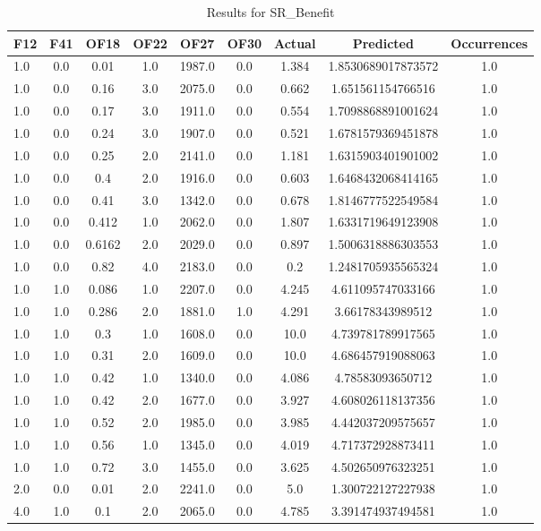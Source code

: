 \clearpage
\begin{table}[htbp]
\centering
\begin{tabular}{|l|c|c|c|c|c|c|c|c|}
\hline
F12 & F41 & OF18 & OF22 & OF27 & OF30 & Actual & Predicted & Occurrences \\
\hline
1.0 & 0.0 & 0.01 & 1.0 & 1987.0 & 0.0 & 1.384 & 1.8530689017873572 & 1.0 \\
1.0 & 0.0 & 0.16 & 3.0 & 2075.0 & 0.0 & 0.662 & 1.651561154766516 & 1.0 \\
1.0 & 0.0 & 0.17 & 3.0 & 1911.0 & 0.0 & 0.554 & 1.7098868891001624 & 1.0 \\
1.0 & 0.0 & 0.24 & 3.0 & 1907.0 & 0.0 & 0.521 & 1.6781579369451878 & 1.0 \\
1.0 & 0.0 & 0.25 & 2.0 & 2141.0 & 0.0 & 1.181 & 1.6315903401901002 & 1.0 \\
1.0 & 0.0 & 0.4 & 2.0 & 1916.0 & 0.0 & 0.603 & 1.6468432068414165 & 1.0 \\
1.0 & 0.0 & 0.41 & 3.0 & 1342.0 & 0.0 & 0.678 & 1.8146777522549584 & 1.0 \\
1.0 & 0.0 & 0.412 & 1.0 & 2062.0 & 0.0 & 1.807 & 1.6331719649123908 & 1.0 \\
1.0 & 0.0 & 0.6162 & 2.0 & 2029.0 & 0.0 & 0.897 & 1.5006318886303553 & 1.0 \\
1.0 & 0.0 & 0.82 & 4.0 & 2183.0 & 0.0 & 0.2 & 1.2481705935565324 & 1.0 \\
1.0 & 1.0 & 0.086 & 1.0 & 2207.0 & 0.0 & 4.245 & 4.611095747033166 & 1.0 \\
1.0 & 1.0 & 0.286 & 2.0 & 1881.0 & 1.0 & 4.291 & 3.66178343989512 & 1.0 \\
1.0 & 1.0 & 0.3 & 1.0 & 1608.0 & 0.0 & 10.0 & 4.739781789917565 & 1.0 \\
1.0 & 1.0 & 0.31 & 2.0 & 1609.0 & 0.0 & 10.0 & 4.686457919088063 & 1.0 \\
1.0 & 1.0 & 0.42 & 1.0 & 1340.0 & 0.0 & 4.086 & 4.78583093650712 & 1.0 \\
1.0 & 1.0 & 0.42 & 2.0 & 1677.0 & 0.0 & 3.927 & 4.608026118137356 & 1.0 \\
1.0 & 1.0 & 0.52 & 2.0 & 1985.0 & 0.0 & 3.985 & 4.442037209575657 & 1.0 \\
1.0 & 1.0 & 0.56 & 1.0 & 1345.0 & 0.0 & 4.019 & 4.717372928873411 & 1.0 \\
1.0 & 1.0 & 0.72 & 3.0 & 1455.0 & 0.0 & 3.625 & 4.502650976323251 & 1.0 \\
2.0 & 0.0 & 0.01 & 2.0 & 2241.0 & 0.0 & 5.0 & 1.300722127227938 & 1.0 \\
4.0 & 1.0 & 0.1 & 2.0 & 2065.0 & 0.0 & 4.785 & 3.391474937494581 & 1.0 \\
\hline
\end{tabular}
\caption{Results for SR_Benefit}
\label{tab:SR_Benefit_results}
\end{table}
